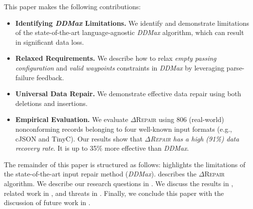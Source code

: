 \documentclass[acmsmall,screen,review,anonymous]{acmart}
\newcommand{\dtask}{data repair\xspace}
\newcommand{\approach}{\textsc{$\Delta$Repair}\xspace}
\newcommand{\ddmax}{\textit{DDMax}\xspace}
\newcommand{\drepair}{\approach}
\begin{document}
This paper makes the following
contributions:
\begin{itemize}
\item \textbf{Identifying \ddmax Limitations.}
We identify and demonstrate limitations of 
the state-of-the-art language-agnostic \ddmax algorithm, which can result in significant data loss.
\item \textbf{Relaxed Requirements.} We describe how to relax
\emph{empty passing configuration} and \emph{valid waypoints} constraints in \ddmax by leveraging parse-failure feedback.
\item \textbf{Universal Data Repair.}
We demonstrate effective \dtask using both deletions and insertions.
\item \textbf{Empirical Evaluation.} We evaluate \drepair using 806 (real-world) nonconforming
records belonging to four well-known input formats (e.g., cJSON and TinyC). 
Our results show that
\textit{\drepair has a high (91\%) data recovery rate}. 
It is up to 35\% more effective than \ddmax.

\end{itemize}

The remainder of this paper is structured as follows: 
 highlights the limitations of the 
state-of-the-art input repair method (\ddmax).
describes the \drepair algorithm. We describe our research questions in
.
We discuss the results in ,
related work in , and threats in .
Finally, we conclude this paper 
with the discussion of future work in . 
\end{document}
